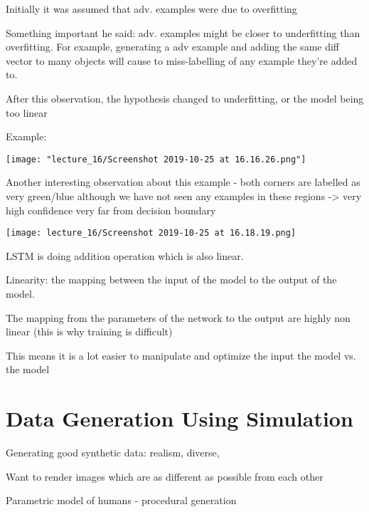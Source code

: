 Initially it was assumed that adv. examples were due to overfitting

Something important he said: adv. examples might be closer to underfitting than overfitting. For example, generating a adv example and adding the same diff vector to many objects will cause to miss-labelling of any example they're added to.

After this observation, the hypothesis changed to underfitting, or the model being too linear

Example:

\texttt{[image: "lecture\_16/Screenshot 2019-10-25 at 16.16.26.png"]}

Another interesting observation about this example - both corners are labelled as very green/blue although we have not seen any examples in these regions -> very high confidence very far from decision boundary

\texttt{[image: lecture\_16/Screenshot 2019-10-25 at 16.18.19.png]}

LSTM is doing addition operation which is also linear. 

Linearity: the mapping between the input of the model to the output of the model.

The mapping from the parameters of the network to the output are highly non linear (this is why training is difficult)

This means it is a lot easier to manipulate and optimize the input the model vs. the model


\section{Data Generation Using Simulation}

Generating good synthetic data: 
realism, 
diverse,

Want to render images which are as different as possible from each other

Parametric model of humans - procedural generation

